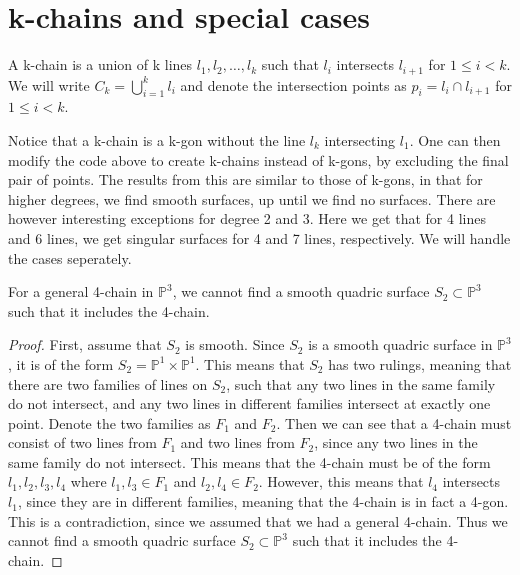 \section{k-chains and special cases}

\begin{definition}
    A k-chain is a union of k lines $l_1, l_2, \dots, l_k$ such that $l_i$ intersects $l_{i+1}$ for $1 \leq i < k$. We will write $C_k = \bigcup_{i=1}^k l_i$ and denote the intersection points as $p_i = l_i \cap l_{i+1}$ for $1 \leq i < k$.
\end{definition}

Notice that a k-chain is a k-gon without the line $l_k$ intersecting $l_1$. One can then modify the code above to create k-chains instead of k-gons, by excluding the final pair of points. The results from this are similar to those of k-gons, in that for higher degrees, we find smooth surfaces, up until we find no surfaces. There are however interesting exceptions for degree 2 and 3. Here we get that for 4 lines and 6 lines, we get singular surfaces for 4 and 7 lines, respectively. We will handle the cases seperately.

\begin{proposition}
    For a general 4-chain in $\mathbb{P}^3$, we cannot find a smooth quadric surface $ S_2 \subset \mathbb{P}^3$ such that it includes the 4-chain.
\end{proposition}

\begin{proof}
    First, assume that $S_2$ is smooth. Since $S_2$ is a smooth quadric surface in $\mathbb{P}^3$, it is of the form $S_2 = \mathbb{P}^1 \times \mathbb{P}^1$. This means that $S_2$ has two rulings, meaning that there are two families of lines on $S_2$, such that any two lines in the same family do not intersect, and any two lines in different families intersect at exactly one point. Denote the two families as $F_1$ and $F_2$. Then we can see that a 4-chain must consist of two lines from $F_1$ and two lines from $F_2$, since any two lines in the same family do not intersect. This means that the 4-chain must be of the form $l_1, l_2, l_3, l_4$ where $l_1, l_3 \in F_1$ and $l_2, l_4 \in F_2$. However, this means that $l_4$ intersects $l_1$, since they are in different families, meaning that the 4-chain is in fact a 4-gon. This is a contradiction, since we assumed that we had a general 4-chain. Thus we cannot find a smooth quadric surface $ S_2 \subset \mathbb{P}^3$ such that it includes the 4-chain.
\end{proof}

